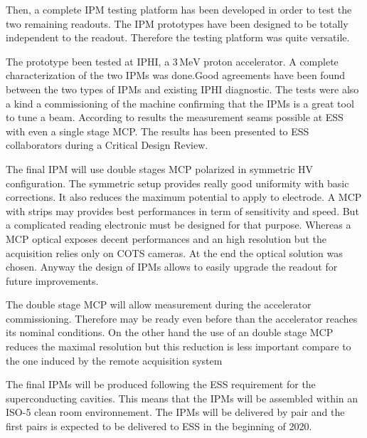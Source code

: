 \begin{refsection}
  Then, a complete IPM testing platform has been developed in order to test the two remaining readouts. The IPM prototypes have been designed to be totally independent to the readout. Therefore the testing platform was quite versatile. 

  The prototype been tested at IPHI, a $3\,\mathrm{MeV}$ proton accelerator. A complete characterization of the two IPMs was done.Good agreements have been found between the two types of IPMs and existing IPHI diagnostic. The tests were also a kind a commissioning of the machine confirming that the IPMs is a great tool to tune a beam. According to results the measurement seams possible at ESS with even a single stage MCP. The results has been presented to ESS collaborators during a Critical Design Review.

  The final IPM will use double stages MCP polarized in symmetric HV configuration. The symmetric setup provides really good uniformity with basic corrections. It also reduces the maximum potential to apply to electrode. 
  A MCP with strips may provides best performances in term of sensitivity and speed. But a complicated reading electronic must be designed for that purpose. Whereas a MCP optical exposes decent performances and an high resolution but the acquisition relies only on COTS cameras.
  At the end the optical solution was chosen. Anyway the design of IPMs allows to easily upgrade the readout for future improvements.
  
  The double stage MCP will allow measurement during the accelerator commissioning. Therefore may be ready even before than the accelerator reaches its nominal conditions. On the other hand the use of an double stage MCP reduces the maximal resolution but this reduction is less important compare to the one induced by the remote acquisition system

  The final IPMs will be produced following the ESS requirement for the superconducting cavities. This means that the IPMs will be assembled within an ISO-5 clean room environnement. The IPMs will be delivered by pair and the first pairs is expected to be delivered to ESS in the beginning of 2020.


\end{refsection}